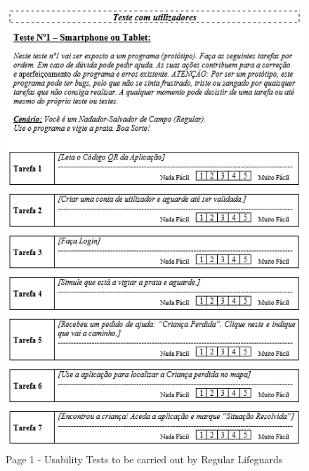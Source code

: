 \begin{figure}[H]
      \centering
      \includegraphics[width=14cm]{figs/UsabilityTest_Regular_1.png}
      \caption{Page 1 - Usability Tests to be carried out by Regular Lifeguards}
      \label{fig:UsabilityTest_Regular_1}
\end{figure}
